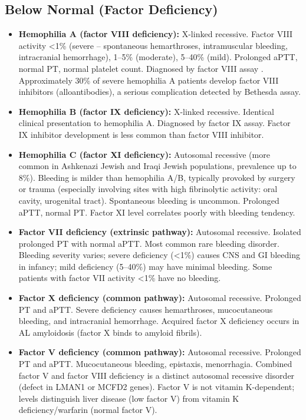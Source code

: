 \subsection*{Below Normal (Factor Deficiency)}
\begin{itemize}
  \item \textbf{Hemophilia A (factor VIII deficiency):} X-linked recessive. Factor VIII activity <1\% (severe -- spontaneous hemarthroses, intramuscular bleeding, intracranial hemorrhage), 1--5\% (moderate), 5--40\% (mild). Prolonged aPTT, normal PT, normal platelet count. Diagnosed by factor VIII assay \cite{kitchen2010diagnosis}. Approximately 30\% of severe hemophilia A patients develop factor VIII inhibitors (alloantibodies), a serious complication detected by Bethesda assay.
  \item \textbf{Hemophilia B (factor IX deficiency):} X-linked recessive. Identical clinical presentation to hemophilia A. Diagnosed by factor IX assay. Factor IX inhibitor development is less common than factor VIII inhibitor.
  \item \textbf{Hemophilia C (factor XI deficiency):} Autosomal recessive (more common in Ashkenazi Jewish and Iraqi Jewish populations, prevalence up to 8\%). Bleeding is milder than hemophilia A/B, typically provoked by surgery or trauma (especially involving sites with high fibrinolytic activity: oral cavity, urogenital tract). Spontaneous bleeding is uncommon. Prolonged aPTT, normal PT. Factor XI level correlates poorly with bleeding tendency.
  \item \textbf{Factor VII deficiency (extrinsic pathway):} Autosomal recessive. Isolated prolonged PT with normal aPTT. Most common rare bleeding disorder. Bleeding severity varies; severe deficiency (<1\%) causes CNS and GI bleeding in infancy; mild deficiency (5--40\%) may have minimal bleeding. Some patients with factor VII activity <1\% have no bleeding.
  \item \textbf{Factor X deficiency (common pathway):} Autosomal recessive. Prolonged PT and aPTT. Severe deficiency causes hemarthroses, mucocutaneous bleeding, and intracranial hemorrhage. Acquired factor X deficiency occurs in AL amyloidosis (factor X binds to amyloid fibrils).
  \item \textbf{Factor V deficiency (common pathway):} Autosomal recessive. Prolonged PT and aPTT. Mucocutaneous bleeding, epistaxis, menorrhagia. Combined factor V and factor VIII deficiency is a distinct autosomal recessive disorder (defect in LMAN1 or MCFD2 genes). Factor V is not vitamin K-dependent; levels distinguish liver disease (low factor V) from vitamin K deficiency/warfarin (normal factor V).

\end{itemize}
